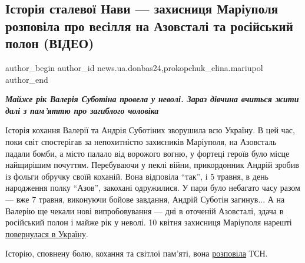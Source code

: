  
 
 
 
 
 
\subsection{Історія сталевої Нави — захисниця Маріуполя розповіла про весілля на Азовсталі та російський полон (ВІДЕО)}
\label{sec:05_05_2023.stz.news.ua.donbas24.1.istoria_stalevoj_navy}
 
\ifcmt
 author_begin
   author_id news.ua.donbas24,prokopchuk_elina.mariupol
 author_end
\fi

\begin{center}
\em\color{blue}\Large\bfseries
Майже рік Валерія Суботіна провела у неволі. Зараз дівчина вчиться жити далі з
пам'яттю про загиблого чоловіка	
\end{center}

Історія кохання Валерії та Андрія Суботіних зворушила всю Україну. В цей час,
поки світ спостерігав за непохитністю захисників Маріуполя, на Азовсталь падали
бомби, а місто палало від ворожого вогню, у фортеці героїв було місце
найщирішим почуттям. Перебуваючи у пеклі війни, прикордонник Андрій зробив із
фольги обручку своїй коханій. Вона відповіла \enquote{так}, і 5 травня, в день
народження полку \enquote{Азов}, закохані одружилися. У пари було небагато часу разом —
вже 7 травня, виконуючи бойове завдання, Андрій Суботін загинув... А на Валерію
ще чекали нові випробовування — дні в оточеній Азовсталі, здача в російський
полон і майже рік у неволі. 10 квітня захисниця Маріуполя нарешті \href{https://donbas24.news/news/nava-povernulasya-z-polonu-zvilnili-zaxisnicyu-mariupolya-valeriyu-subotinu}{повернулася в Україну}.

Історію, сповнену болю, кохання та світлої пам'яті, вона \href{https://www.youtube.com/watch?v=SuTVEPisKJQ}{розповіла} ТСН.

